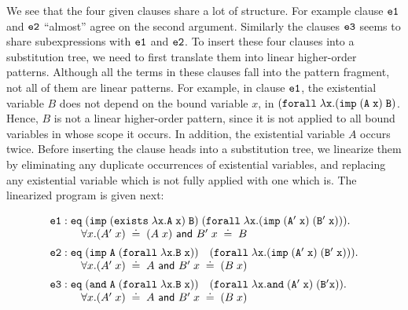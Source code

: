 \documentclass{llncs}
\newcommand{\typeLF}{\tt{type}}
\newcommand{\propLF}{\tt{prop}}
\newcommand{\andLF}{\tt{and}\;}
\newcommand{\impLF}{\tt{imp}\;}
\newcommand{\forallLF}{\tt{forall}\;}
\newcommand{\existsLF}{\tt{exists}\;}
\newcommand{\eqLF}{\tt{eq}\;}
\newcommand{\eqilLF}{\tt{e1}}
\newcommand{\eqirLF}{\tt{e2}}
\newcommand{\eqalLF}{\tt{e3}}
\newcommand{\eqarLF}{\tt{e4}}
\newcommand{\unif}{\;\doteq\;}
\begin{document}
We see that the four given clauses share a lot of structure. For
example clause $\eqilLF$ and $\eqirLF$ ``almost'' agree on the second
argument. Similarly the clauses $\eqalLF$ seems to share subexpressions
with $\eqilLF$ and $\eqirLF$. To insert these four clauses into a
substitution tree, we need to first translate them into linear
higher-order patterns. Although all the terms in these clauses fall
into the pattern fragment, not all of them are linear patterns.
For example, in clause $\eqilLF$, 
%
the existential variable $B$ does not depend on the bound variable
$x$, in $(\forallLF \lambda x. (\impLF (A\; x)\; B)$. Hence, $B$ is
not a linear higher-order pattern, since it is not applied to all
bound variables in whose scope it occurs. In addition, the existential
variable $A$ occurs twice. Before inserting the clause heads into a
substitution tree, we linearize them by eliminating any duplicate
occurrences of existential variables, and replacing any existential
variable which is not fully applied with one which is. The linearized
program  is given next:


\begin{small}
\[
\begin{array}{ll}
%
\eqilLF: \eqLF (\impLF (\existsLF \lambda x. A\; x)\; B)\;
                 (\forallLF \lambda x. (\impLF (A'\; x)\; (B'\;x))). \\
\hspace{1cm}\forall x. (A'\; x) \unif (A \; x) {\textsf{ and } } B'\;x   \unif B\\[0.5em]
\eqirLF: \eqLF (\impLF A\; (\forallLF \lambda x. B\;x))\quad
                 (\forallLF \lambda x. (\impLF (A'\;x) \; (B'\; x))).\\
\hspace{1cm} \forall x. (A'\; x) \unif A  {\textsf{ and }} B'\;x   \unif (B\;x)\\[0.5em]
\eqalLF: \eqLF (\andLF A \; (\forallLF \lambda x. B\; x)) \quad
                 (\forallLF \lambda x. \andLF (A'\;x) \; (B' x)).\\
\hspace{1cm} \forall x. (A'\; x) \unif A  {\textsf{ and }} B'\;x   \unif (B\;x)\\[0.5em]
\end{array}
\]
\end{small}
\end{document}
